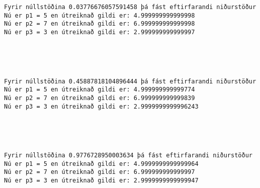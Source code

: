 \documentclass[11pt]{article}
\begin{document}
    \begin{Verbatim}[commandchars=\\\{\}]
Fyrir núllstöðina 0.03776676057591458 þá fást eftirfarandi niðurstöður
Nú er p1 = 5 en útreiknað gildi er: 4.999999999999998
Nú er p2 = 7 en útreiknað gildi er: 6.999999999999998
Nú er p3 = 3 en útreiknað gildi er: 2.999999999999997



    \end{Verbatim}

    \begin{center}
    \end{center}
    { \hspace*{\fill} \\}
    
    \begin{Verbatim}[commandchars=\\\{\}]
Fyrir núllstöðina 0.45887818104896444 þá fást eftirfarandi niðurstöður
Nú er p1 = 5 en útreiknað gildi er: 4.999999999999774
Nú er p2 = 7 en útreiknað gildi er: 6.999999999999839
Nú er p3 = 3 en útreiknað gildi er: 2.9999999999996243



    \end{Verbatim}

    \begin{center}
    \end{center}
    { \hspace*{\fill} \\}
    
    \begin{Verbatim}[commandchars=\\\{\}]
Fyrir núllstöðina 0.9776728950003634 þá fást eftirfarandi niðurstöður
Nú er p1 = 5 en útreiknað gildi er: 4.9999999999999964
Nú er p2 = 7 en útreiknað gildi er: 6.999999999999997
Nú er p3 = 3 en útreiknað gildi er: 2.9999999999999947



    \end{Verbatim}

    \begin{center}
    \end{center}
    { \hspace*{\fill} \\}
    
\end{document}

